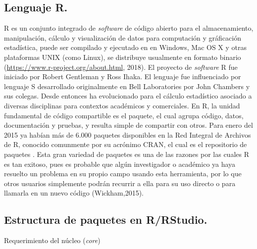 \subsection{Lenguaje R.}

R es un conjunto  integrado de \textit{software} de código abierto para el almacenamiento, manipulación, cálculo y visualización de datos para computación y gráficación estadística, puede ser compilado y ejecutado en  en Windows, Mac OS X y otras  plataformas UNIX (como Linux), se distribuye usualmente en formato binario (\url{https://www.r-project.org/about.html}, 2018). El proyecto de \emph{software} R fue iniciado por Robert Gentleman y Ross Ihaka. El lenguaje fue influenciado por  lenguaje S desarrollado originalmente en Bell Laboratories por John Chambers y sus colegas. Desde entonces ha evolucionado  para el cálculo estadístico asociado a diversas disciplinas para contextos académicos y comerciales. En R, la unidad fundamental de código compartible es el paquete, el cual agrupa código, datos, documentación y pruebas, y resulta simple de compartir con otros. Para enero del 2015 ya habían más de 6.000 paquetes disponibles en la Red Integral de Archivos de R, conocido comunmente por su acrónimo CRAN, el cual es el repositorio de paquetes . Esta gran variedad de paquetes es una de las razones por las cuales R es tan exitoso, pues es probable que algún investigador o académico ya haya resuelto un problema en su propio campo usando esta herramienta, por lo que otros usuarios simplemente podrán recurrir a ella para su uso directo o para llamarla en un nuevo código (Wickham,2015). \\

\subsection{Estructura de paquetes en R/RStudio.}

Requerimiento del núcleo (\textit{core})

